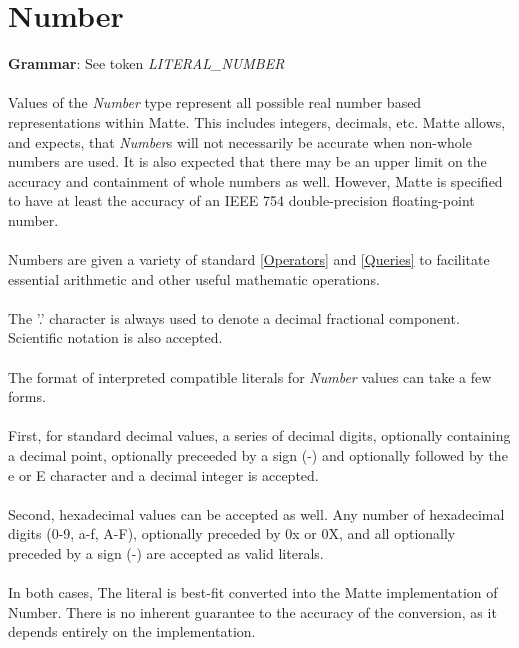 \documentclass[12pt,letterpaper]{report}
\begin{document}



\section{Number}\label{Number}

\textbf{Grammar}: See token \textit{LITERAL\_NUMBER}
\\\\
Values of the \textit{Number} type represent all possible real number based representations within 
Matte. This includes integers, decimals, etc. Matte allows, and expects, that \textit{Number}s will not 
necessarily be accurate when non-whole numbers are used. It is also expected that there may 
be an upper limit on the accuracy and containment of whole numbers as well. However, Matte is 
specified to have at least the accuracy of an IEEE 754 double-precision floating-point number.
\\\\
Numbers are given a variety of standard \autoref{Operators} and \autoref{Queries} to facilitate 
essential arithmetic and other useful mathematic operations.
\\\\
The '.' character is always used to denote a decimal fractional component. Scientific notation
is also accepted. 
\\\\
The format of interpreted compatible literals for \textit{Number} values can take a few forms. 
\\\\
First, for standard decimal values, a series of decimal digits, optionally containing a decimal point, 
optionally preceeded by a sign (-) and optionally followed by the e or E character and a 
decimal integer is accepted.
\\\\
Second, hexadecimal values can be accepted as well. Any number of hexadecimal digits (0-9, a-f, A-F), 
optionally preceded by 0x or 0X, and all optionally preceded by a sign (-) are accepted 
as valid literals.
\\\\
In both cases, The literal is best-fit converted into the Matte implementation of Number. 
There is no inherent guarantee to the accuracy of the conversion, as it depends 
entirely on the implementation. 
\\\\
\end{document}
